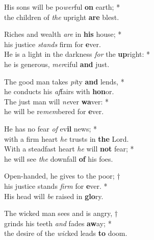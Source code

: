 His sons will be po\emph{wer}ful \textbf{on} earth; *\\
the children of \emph{the} upright \textbf{are} blest.

Riches and wealth \emph{are} in \textbf{his} house; *\\
his justice \emph{stands} firm for \textbf{e}ver.\\
He is a light in the darkness \emph{for} the \textbf{up}right: *\\
he is generous, \emph{mer}ciful \textbf{and} just.

The good man takes \emph{pi}ty \textbf{and} lends, *\\
he conducts his \emph{af}fairs with \textbf{hon}or.\\
The just man will \emph{ne}ver \textbf{wa}ver: *\\
he will be re\emph{mem}bered for \textbf{e}ver.

He has no fear \emph{of} ev\textbf{il} news; *\\
with a firm heart \emph{he} trusts in \textbf{the} Lord.\\
With a steadfast heart \emph{he} will \textbf{not} fear; *\\
he will see \emph{the} downfall \textbf{of} his foes.

Open-handed, he gives to the poor; †\\
his justice stands \emph{firm} for \textbf{e}ver. *\\
His head will \emph{be} raised in \textbf{glo}ry.

The wicked man sees and is angry, †\\
grinds his teeth \emph{and} fades \textbf{aw}ay; *\\
the desire of the \emph{wic}ked leads \textbf{to} doom.